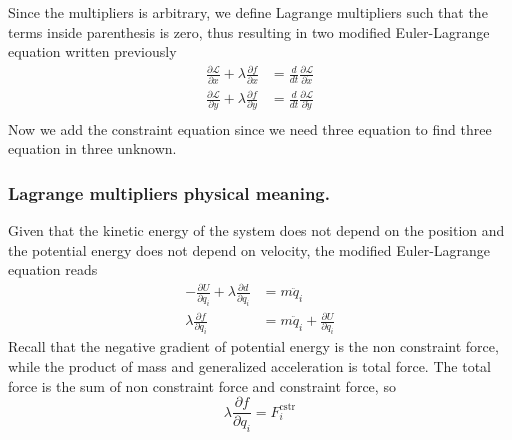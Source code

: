 \documentclass[../../../main.tex]{subfiles}
\begin{document}
Since the multipliers is arbitrary, we define Lagrange multipliers such that the terms inside parenthesis is zero, thus resulting in two modified Euler-Lagrange equation written previously
\begin{align*}
	\frac{\partial \mathcal{L}}{\partial x}+\lambda\frac{\partial f}{\partial x} & =\frac{d}{dt}\frac{\partial \mathcal{L}}{\partial \dot{x}} \\
	\frac{\partial \mathcal{L}}{\partial y}+\lambda\frac{\partial f}{\partial y} & =\frac{d}{dt}\frac{\partial \mathcal{L}}{\partial \dot{y}} \\
\end{align*}
Now we add the constraint equation since we need three equation to find three equation in three unknown.

\subsubsection*{Lagrange multipliers physical meaning.}
Given that the kinetic energy of the system does not depend on the position and the potential energy does not depend on velocity, the modified Euler-Lagrange equation reads
\begin{align*}
	-\frac{\partial U}{\partial q_i}+\lambda\frac{\partial d}{\partial q_i}&=m\ddot{q}_i\\
	\lambda\frac{\partial f}{\partial q_i}&=m\ddot{q}_i+\frac{\partial U}{\partial q_i}
\end{align*}
Recall that the negative gradient of potential energy is the non constraint force, while the product of mass and generalized acceleration is total force. 
The total force is the sum of non constraint force and constraint force, so 
\begin{equation*}
	\lambda\frac{\partial f}{\partial q_i}=F_i^{\text{cstr}}	
\end{equation*}
\end{document}
